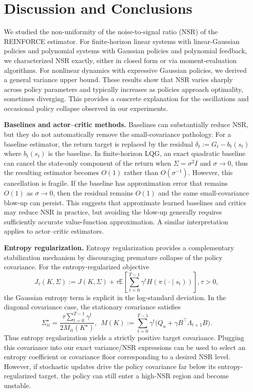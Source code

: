 \vspace{-2mm}
\section{Discussion and Conclusions}
\vspace{-2mm}
\label{sec:conclusions}

We studied the non-uniformity of the noise-to-signal ratio (NSR) of the REINFORCE estimator. For finite-horizon linear systems with linear-Gaussian policies and polynomial systems with Gaussian policies and polynomial feedback, we characterized NSR exactly, either in closed form or via moment-evaluation algorithms. For nonlinear dynamics with expressive Gaussian policies, we derived a general variance upper bound. These results show that NSR varies sharply across policy parameters and typically increases as policies approach optimality, sometimes diverging. This provides a concrete explanation for the oscillations and occasional policy collapse observed in our experiments.

\textbf{Baselines and actor--critic methods.}
Baselines can substantially reduce NSR, but they do not automatically remove the small-covariance pathology. For a baseline estimator, the return target is replaced by the residual $\delta_t := G_t - b_t(s_t)$ where $b_t(s_t)$ is the baseline. In finite-horizon LQG, an exact quadratic baseline can cancel the state-only component of the return when $\Sigma=\sigma^2 I$ and $\sigma\to 0$, thus the resulting estimator becomes $O(1)$ rather than $O(\sigma^{-1})$. However, this cancellation is fragile. If the baseline has approximation error that remains $O(1)$ as $\sigma\to 0$, then the residual remains $O(1)$ and the same small-covariance blow-up can persist. This suggests that approximate learned baselines and critics may reduce NSR in practice, but avoiding the blow-up generally requires sufficiently accurate value-function approximation. A similar interpretation applies to actor--critic estimators.

\textbf{Entropy regularization.}
Entropy regularization provides a complementary stabilization mechanism by discouraging premature collapse of the policy covariance. For the entropy-regularized objective
\[
    J_\tau(K,\Sigma)
    :=
    J(K,\Sigma)
    + \tau \mathbb{E}\!\left[
        \sum_{t=0}^{T-1} \gamma^t
        H(\pi(\cdot\mid s_t))
    \right], \tau>0,
\]
the Gaussian entropy term is explicit in the log-standard deviation. In the diagonal covariance case, the stationary covariance satisfies
\[
    \Sigma^\star_{ii}
    =
    \frac{\tau \sum_{t=0}^{T-1}\gamma^t}{2M_{ii}(K^\star)},~~ M(K)
    :=
    \sum_{t=0}^{T-1}\gamma^t
    \bigl(
    Q_a + \gamma B^\top \Lambda_{t+1} B
    \bigr).
\]
Thus entropy regularization yields a strictly positive target covariance. Plugging this covariance into our exact variance/NSR expressions can be used to select an entropy coefficient or covariance floor corresponding to a desired NSR level. However, if stochastic updates drive the policy covariance far below its entropy-regularized target, the policy can still enter a high-NSR region and become unstable.

